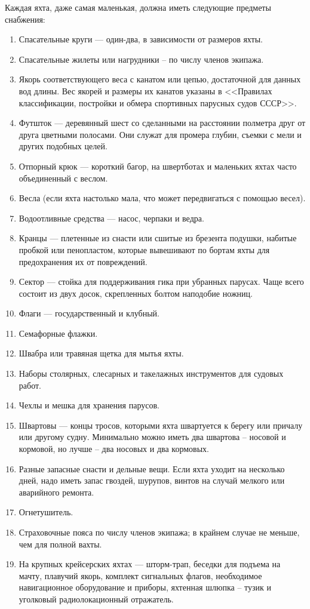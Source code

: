 \documentclass[a4paper, 12pt, twoside, final]{scrbook}
\begin{document}
Каждая яхта, даже самая маленькая, должна иметь следующие предметы снабжения:
\begin{enumerate}
\item Спасательные круги --- один\--два, в зависимости от размеров яхты.
\item Спасательные жилеты или нагрудники \--- по числу членов экипажа.
\item Якорь соответствующего веса с канатом или цепью, достаточной для данных вод длины. Вес якорей и размеры их канатов указаны в <<Правилах классификации, постройки и обмера спортивных парусных судов СССР>>.
\item Футшток --- деревянный шест со сделанными на расстоянии полметра друг от друга цветными полосами. Они служат для промера глубин, съемки с мели и других подобных целей.
\item Отпорный крюк --- короткий багор, на швертботах и маленьких яхтах часто объединенный с веслом.
\item Весла (если яхта настолько мала, что может передвигаться с помощью весел).
\item Водоотливные средства --- насос, черпаки и ведра.
\item Кранцы --- плетенные из снасти
или сшитые из брезента подушки, набитые пробкой или пенопластом, которые вывешивают по бортам яхты для предохранения их от повреждений.
\item Сектор --- стойка для поддерживания гика при убранных парусах. Чаще всего состоит из двух досок, скрепленных болтом наподобие ножниц.
\item Флаги --- государственный и клубный.
\item Семафорные флажки. 
\item Швабра или травяная щетка для мытья яхты.
\item Наборы столярных, слесарных и такелажных инструментов для судовых работ.
\item Чехлы и мешка для хранения парусов.
\item Швартовы --- концы тросов, которыми яхта швартуется к берегу или причалу или другому судну. Минимально можно иметь два швартова \--- носовой и кормовой, но лучше \--- два носовых и два кормовых.
\item Разные запасные снасти и дельные вещи. Если яхта уходит на несколько дней, надо иметь запас гвоздей, шурупов, винтов на случай мелкого или аварийного ремонта.
\item Огнетушитель. 
\item Страховочные пояса по числу членов экипажа; в крайнем случае не меньше, чем для полной вахты.
\item На крупных крейсерских яхтах --- шторм-трап, беседки для подъема на мачту, плавучий якорь, комплект сигнальных флагов, необходимое навигационное оборудование и приборы, яхтенная шлюпка \--- тузик и уголковый радиолокационный отражатель.
\end{enumerate}
\end{document}
